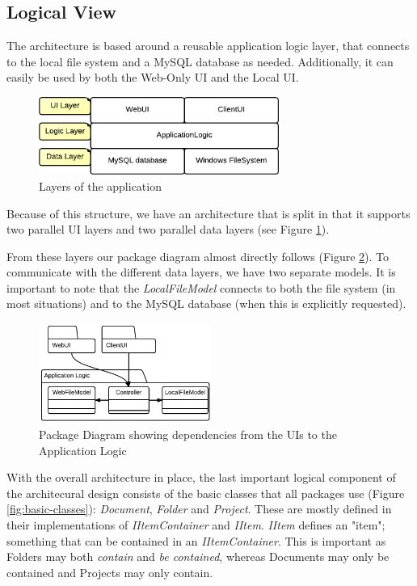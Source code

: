 \subsection{Logical View}

The architecture is based around a reusable application logic layer, that connects to the
local file system and a MySQL database as needed. Additionally, it can easily be used by
both the Web-Only UI and the Local UI.

\begin{figure}[htb]
	\centering
	\includegraphics[width=0.7\textwidth]{Software_architecture/graphics/application-layers.png}
	\caption{Layers of the application}
	\label{fig:application-layers}
\end{figure}

Because of this structure, we have an architecture that is split in that it supports two
parallel UI layers and two parallel data layers (see Figure \ref{fig:application-layers}).

From these layers our package diagram almost directly follows (Figure \ref{fig:package-diagram}).
To communicate with the different data layers, we have two separate models. It is important to
note that the \emph{LocalFileModel} connects to both the file system (in most situations) and
to the MySQL database (when this is explicitly requested).

\begin{figure}[htb]
	\centering
	\includegraphics[width=0.5\textwidth]{Software_architecture/graphics/package-diagram.png}
	\caption{Package Diagram showing dependencies from the UIs to the Application Logic}
	\label{fig:package-diagram}
\end{figure}

With the overall architecture in place, the last important logical component of the architecural design
consists of the basic classes that all packages use (Figure \ref{fig:basic-classes}): \emph{Document},
\emph{Folder} and \emph{Project}. These are mostly defined in their implementations of \emph{IItemContainer}
and \emph{IItem}. \emph{IItem} defines an "item"; something that can be contained in an
\emph{IItemContainer}. This is important as Folders may both \emph{contain} and \emph{be contained},
whereas Documents may only be contained and Projects may only contain.

